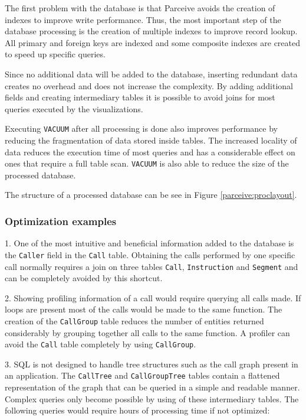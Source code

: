 The first problem with the database is that Parceive avoids the creation of indexes to improve write performance. Thus, the most important step of the database processing is the creation of multiple indexes to improve record lookup. All primary and foreign keys are indexed and some composite indexes are created to speed up specific queries.

Since no additional data will be added to the database, inserting redundant data creates no overhead and does not increase the complexity. By adding additional fields and creating intermediary tables it is possible to avoid joins for most queries executed by the visualizations. 

Executing \texttt{VACUUM} after all processing is done also improves performance by reducing the fragmentation of data stored inside tables. The increased locality of data reduces the execution time of most queries and has a considerable effect on ones that require a full table scan. \texttt{VACUUM} is also able to reduce the size of the processed database.

The structure of a processed database can be see in Figure \ref{parceive:proclayout}.

\subsubsection{Optimization examples}

1. One of the most intuitive and beneficial information added to the database is the \texttt{Caller} field in the \texttt{Call} table. Obtaining the calls performed by one specific call normally requires a join on three tables \texttt{Call}, \texttt{Instruction} and \texttt{Segment} and can be completely avoided by this shortcut.

2. Showing profiling information of a call would require querying all calls made. If loops are present most of the calls would be made to the same function. The creation of the \texttt{CallGroup} table reduces the number of entities returned considerably by grouping together all calls to the same function. A profiler can avoid the \texttt{Call} table completely by using \texttt{CallGroup}.

3. SQL is not designed to handle tree structures such as the call graph present in an application. The \texttt{CallTree} and \texttt{CallGroupTree} tables contain a flattened representation of the graph that can be queried in a simple and readable manner. Complex queries only become possible by using of these intermediary tables. The following queries would require hours of processing time if not optimized:

